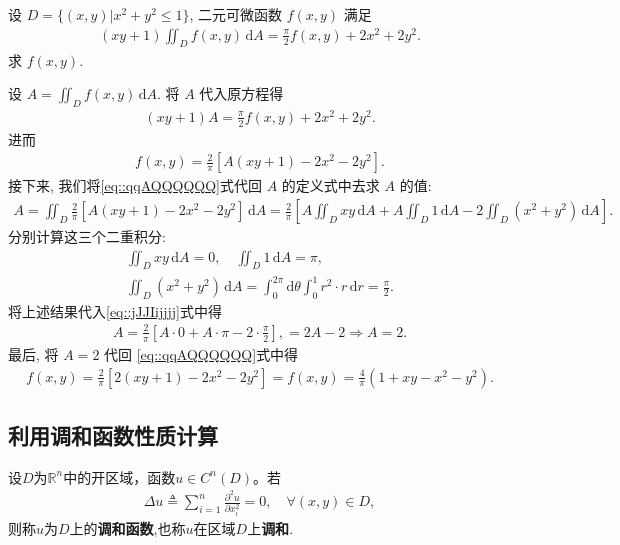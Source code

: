 \documentclass[../../main.tex]{subfiles}%
\begin{document}
\begin{example}
设 \(D = \{(x,y)|x^2 + y^2 \leqslant 1\}\), 二元可微函数 \(f(x,y)\) 满足
\begin{align*}
(xy+1)\iint_D f(x,y)\,\mathrm{d}A = \frac{\pi}{2} f(x,y) + 2x^2 + 2y^2.
\end{align*}
求 \(f(x,y)\).
\end{example}
\begin{solution}
设 \(A = \iint_D f(x,y)\,\mathrm{d}A\). 将 \(A\) 代入原方程得
\begin{align*}
(xy+1)A = \frac{\pi}{2} f(x,y) + 2x^2 + 2y^2.
\end{align*}
进而
\begin{align}\label{eq::qqAQQQQQQ}
f(x,y) = \frac{2}{\pi} \left[ A(xy+1) - 2x^2 - 2y^2 \right].
\end{align}
接下来, 我们将\eqref{eq::qqAQQQQQQ}式代回 \(A\) 的定义式中去求 \(A\) 的值:
\begin{align}\label{eq::jJJIijjjj}
A = \iint_D \frac{2}{\pi} \left[ A(xy+1) - 2x^2 - 2y^2 \right] \,\mathrm{d}A= \frac{2}{\pi} \left[ A \iint_D xy \,\mathrm{d}A + A \iint_D 1 \,\mathrm{d}A - 2 \iint_D (x^2+y^2) \,\mathrm{d}A \right].
\end{align}
分别计算这三个二重积分:
\begin{gather*}
\iint_D xy \,\mathrm{d}A = 0, \quad
\iint_D 1 \,\mathrm{d}A = \pi, \\
\iint_D (x^2+y^2) \,\mathrm{d}A = \int_0^{2\pi} \mathrm{d}\theta \int_0^1 r^2 \cdot r \,\mathrm{d}r =\frac{\pi}{2}.
\end{gather*}
将上述结果代入\eqref{eq::jJJIijjjj}式中得
\begin{align*}
A = \frac{2}{\pi} \left[ A \cdot 0 + A \cdot \pi - 2 \cdot \frac{\pi}{2} \right], =2A - 2\Longrightarrow A=2.
\end{align*}
最后, 将 \(A=2\) 代回 \eqref{eq::qqAQQQQQQ}式中得
\begin{align*}
f(x,y) = \frac{2}{\pi} \left[ 2(xy+1) - 2x^2 - 2y^2 \right]=f(x,y) = \frac{4}{\pi}(1+xy-x^2-y^2).
\end{align*}
\end{solution}


\subsection{利用调和函数性质计算}

\begin{definition}
设$D$为$\mathbb{R}^n$中的开区域，函数$u\in C^n(D)$。若
\begin{align*}
\Delta u\triangleq \sum_{i=1}^n{\frac{\partial ^2u}{\partial x_{i}^{2}}}=0, \quad \forall (x,y)\in D,
\end{align*}
则称$u$为$D$上的\textbf{调和函数},也称$u$在区域$D$上\textbf{调和}.
\end{definition}
\end{document}
